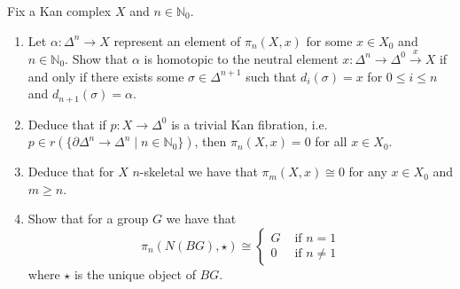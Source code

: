 \begin{Exercise}
\label{Exercise_11.2}

Fix a Kan complex $ X $ and $ n \in \mathbb{N}_0$.

\begin{enumerate}[label=(\alph*)]
    \item 
    Let $ \alpha: \Delta^n \to X $ represent an element of $ \pi_n ( X , x ) $ for some $ x \in X_0 $ and $ n \in \mathbb{N}_0 $.
    Show that $ \alpha $ is homotopic to the neutral element $ x : \Delta^n \to \Delta^0 \xrightarrow{x} X $ if and only if there exists some $ \sigma \in \Delta^{n+1}$ such that $ d_i ( \sigma ) = x $ for $ 0 \leq  i \leq n $ and $ d_{n+1} ( \sigma ) = \alpha $.

    \item 
    Deduce that if $ p : X \to \Delta^0 $ is a trivial Kan fibration, i.e. $p \in r ( \{ \partial \Delta^n \to \Delta^n \mid n \in \mathbb{N}_0 \} )$, then $ \pi_n( X , x ) = 0 $ for all $ x \in X_0 $.

    \item 
    Deduce that for $X$ $n$-skeletal we have that $\pi_m ( X , x ) \cong 0 $ for any $ x \in X_0 $ and $ m \geq n $.

    \item 
    Show that for a group $ G $ we have that 
    \[
        \pi_n ( N ( BG ) , \star ) 
        \cong 
        \begin{cases}
            G &\text{ if }  n = 1
            \\
            0 &\text{ if }  n \neq 1
        \end{cases}
    \]
    where $ \star $ is the unique object of $ BG $.
\end{enumerate}
\end{Exercise}



